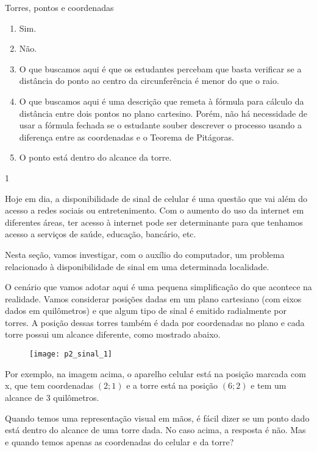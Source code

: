\begin{answer}{Torres, pontos e coordenadas}
{
\begin{enumerate}
\item Sim.

\item Não.

\item O que buscamos aqui é que os estudantes percebam que basta verificar se a distância do ponto ao centro da circunferência é menor do que o raio.

\item O que buscamos aqui é uma descrição que remeta à fórmula para cálculo da distância entre dois pontos no plano cartesino. Porém, não há necessidade de usar a fórmula fechada se o estudante souber descrever o processo usando a diferença entre as coordenadas e o Teorema de Pitágoras.

\item O ponto está dentro do alcance da torre.
\end{enumerate}
}{1}
\end{answer}

Hoje em dia, a disponibilidade de sinal de celular é uma questão que vai além do acesso a redes sociais ou entretenimento. Com o aumento do uso da internet em diferentes áreas, ter acesso à internet pode ser determinante para que tenhamos acesso a serviços de saúde, educação, bancário, etc.

Nesta seção, vamos investigar, com o auxílio do computador, um problema relacionado à disponibilidade de sinal em uma determinada localidade.

O cenário que vamos adotar aqui é uma pequena simplificação do que acontece na realidade. Vamos considerar posições dadas em um plano cartesiano (com eixos dados em quilômetros) e que algum tipo de sinal é emitido radialmente por torres. A posição dessas torres também é dada por coordenadas no plano e cada torre possui um alcance diferente, como mostrado abaixo.

\begin{figure}[H]
\centering

\texttt{[image: p2\_sinal\_1]}
\end{figure}

Por exemplo, na imagem acima, o aparelho celular está na posição marcada com x, que tem coordenadas $(2;1)$ e a torre está na posição $(6;2)$ e tem um alcance de $3$ quilômetros.

Quando temos uma representação visual em mãos, é fácil dizer se um ponto dado está dentro do alcance de uma torre dada. No caso acima, a resposta é não. Mas e quando temos apenas as coordenadas do celular e da torre?

